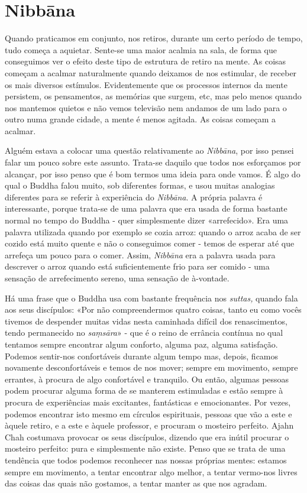 \chapter{Nibbāna}

Quando praticamos em conjunto, nos retiros, durante um certo período de
tempo, tudo começa a aquietar. Sente-se uma maior acalmia na sala, de
forma que conseguimos ver o efeito deste tipo de estrutura de retiro na
mente. As coisas começam a acalmar naturalmente quando deixamos de nos
estimular, de receber os mais diversos estímulos. Evidentemente que os
processos internos da mente persistem, os pensamentos, as memórias que
surgem, etc, mas pelo menos quando nos mantemos quietos e não vemos
televisão nem andamos de um lado para o outro numa grande cidade, a
mente é menos agitada. As coisas começam a acalmar.

Alguém estava a colocar uma questão relativamente ao \emph{Nibbāna}, por
isso pensei falar um pouco sobre este assunto. Trata-se daquilo que
todos nos esforçamos por alcançar, por isso penso que é bom termos uma
ideia para onde vamos. É algo do qual o Buddha falou muito, sob
diferentes formas, e usou muitas analogias diferentes para se referir à
experiência do \emph{Nibbāna}. A própria palavra é interessante, porque
trata-se de uma palavra que era usada de forma bastante normal no tempo
do Buddha - quer simplesmente dizer «arrefecido». Era uma palavra
utilizada quando por exemplo se cozia arroz: quando o arroz acaba de ser
cozido está muito quente e não o conseguimos comer - temos de esperar
até que arrefeça um pouco para o comer. Assim, \emph{Nibbāna} era a
palavra usada para descrever o arroz quando está suficientemente frio
para ser comido - uma sensação de arrefecimento sereno, uma sensação de
à-vontade.

Há uma frase que o Buddha usa com bastante frequência nos \emph{suttas,}
quando fala aos seus discípulos: «Por não compreendermos quatro coisas,
tanto eu como vocês tivemos de despender muitas vidas nesta caminhada
difícil dos renascimentos, tendo permanecido no \emph{saṃsāra}» - que é
o reino de errância contínua no qual tentamos sempre encontrar algum
conforto, alguma paz, alguma satisfação. Podemos sentir-nos confortáveis
durante algum tempo mas, depois, ficamos novamente desconfortáveis e
temos de nos mover; sempre em movimento, sempre errantes, à procura de
algo confortável e tranquilo. Ou então, algumas pessoas podem procurar
alguma forma de se manterem estimuladas e estão sempre à procura de
experiências mais excitantes, fantásticas e emocionantes. Por vezes,
podemos encontrar isto mesmo em círculos espirituais, pessoas que vão a
este e àquele retiro, e a este e àquele professor, e procuram o mosteiro
perfeito. Ajahn Chah costumava provocar os seus discípulos, dizendo que
era inútil procurar o mosteiro perfeito: pura e simplesmente não existe.
Penso que se trata de uma tendência que todos podemos reconhecer nas
nossas próprias mentes: estamos sempre em movimento, a tentar encontrar
algo melhor, a tentar vermo-nos livres das coisas das quais não
gostamos, a tentar manter as que nos agradam.

